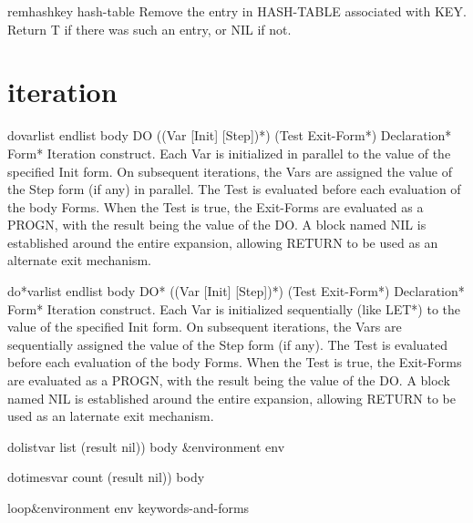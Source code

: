 \begin{function}{remhash}{key hash-table}{}
  Remove the entry in HASH-TABLE associated with KEY. Return T if
there was such an entry, or NIL if not.
\end{function}

\section{iteration}

\begin{macro}{do}{varlist endlist \body body}{}
  DO ({(Var [Init] [Step])}*) (Test Exit-Form*) Declaration* Form*
  Iteration construct. Each Var is initialized in parallel to the value of the
  specified Init form. On subsequent iterations, the Vars are assigned the
  value of the Step form (if any) in parallel. The Test is evaluated before
  each evaluation of the body Forms. When the Test is true, the Exit-Forms
  are evaluated as a PROGN, with the result being the value of the DO. A block
  named NIL is established around the entire expansion, allowing RETURN to be
  used as an alternate exit mechanism.
\end{macro}

\begin{macro}{do*}{varlist endlist \body body}{}
  DO* ({(Var [Init] [Step])}*) (Test Exit-Form*) Declaration* Form*
  Iteration construct. Each Var is initialized sequentially (like LET*) to the
  value of the specified Init form. On subsequent iterations, the Vars are
  sequentially assigned the value of the Step form (if any). The Test is
  evaluated before each evaluation of the body Forms. When the Test is true,
  the Exit-Forms are evaluated as a PROGN, with the result being the value
  of the DO. A block named NIL is established around the entire expansion,
  allowing RETURN to be used as an laternate exit mechanism.
\end{macro}

\begin{macro}{dolist}{var list \op (result nil)) \body body &environment env}{}
  
\end{macro}

\begin{macro}{dotimes}{var count \op (result nil)) \body body}{}
  
\end{macro}

\begin{macro}{loop}{&environment env \rest keywords-and-forms}{}
  
\end{macro}

